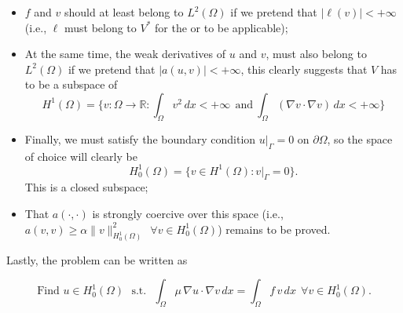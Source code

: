 \begin{itemize}
\item $f$ and $v$ should at least belong to $L^2(\Omega)$ if we
pretend that $|\ell(v)| < +\infty$ (i.e., $\ell$ must belong to $V^*$ for
the  or  to be applicable);\\
\item At the same time, the weak derivatives of $u$ and $v$, 
must also belong to $L^2(\Omega)$ if we pretend that
$|a(u,v)| < +\infty$, this clearly suggests that
$V$ has to be a subspace of
\begin{equation}
H^1(\Omega) = \{v: \Omega \rightarrow \mathbb{R} : \int_{\Omega}{v^2} \,dx < +\infty~~\mbox{and}~ \int_{\Omega}{(\nabla{v}\cdot\nabla{v})} \,dx < +\infty\} \nonumber
\end{equation}
\item Finally, we must satisfy the boundary condition
$u|_{\Gamma} = 0$ on $\partial{\Omega}$, so the space of choice will
clearly be
\begin{equation}
H^1_0(\Omega) = \{v \in H^1(\Omega) : v|_{\Gamma} = 0 \}. \nonumber
\end{equation}
This is a closed subspace; \\


\item That $a(\cdot,\cdot)$ is strongly coercive over this space
(i.e., $a(v,v) \ge \alpha \lVert v \rVert^2_{H^1_0(\Omega)}~~\forall v \in H^1_0(\Omega)$)
remains to be proved.
\end{itemize}
Lastly, the problem can be written as
\begin{kaobox}[frametitle=Weak form of Poisson's problem with $g = 0$]
\vspace{-0.25cm}
\begin{equation}
\mbox{Find $u \in H^1_0(\Omega)$~~s.t.~~} \int_{\Omega}{\mu\,\nabla{u}\cdot \nabla{v}}\,dx =
        \int_{\Omega}{f\,v}\,dx~~\forall v \in H^1_0(\Omega). \nonumber
\end{equation}
\end{kaobox}

